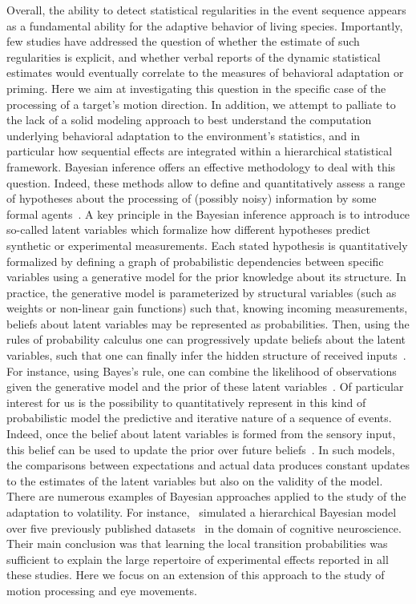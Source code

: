 \documentclass[10pt,letterpaper]{article}
\newcommand{\citep}[1]{\cite{#1}}
\newcommand{\citet}[1]{\cite{#1}}
\begin{document}
Overall, the ability to detect
statistical regularities in the event sequence appears as a fundamental ability
for the adaptive behavior of living species.
Importantly, few studies have addressed the question of whether
the estimate of such regularities is explicit,
and whether verbal reports of the dynamic statistical
estimates would eventually correlate to the measures of behavioral adaptation or priming.
Here we aim at investigating this question
in the specific case of the  processing of a target's motion direction.
In addition, we attempt to palliate to the lack of a solid modeling approach
to best understand the computation underlying behavioral adaptation to the environment's statistics,
and in particular how sequential effects are integrated
within a hierarchical statistical framework.
Bayesian inference offers an effective methodology
to deal with this question.
Indeed, these methods allow to define and quantitatively assess
a range of hypotheses about the processing of (possibly noisy) information by some formal agents~\citep{Deneve1999, Diaconescu2014, Daunizeau10a}.
A key principle in the Bayesian inference approach is
to introduce so-called latent variables
which formalize how different hypotheses predict synthetic or experimental measurements.
Each stated hypothesis is quantitatively formalized
by defining a graph of probabilistic dependencies between specific variables
using a generative model for the prior knowledge about its structure.
In practice, the generative model is parameterized by structural variables
(such as weights or non-linear gain functions)
such that, knowing incoming measurements, beliefs about latent variables
may be represented as probabilities.
Then, using the rules of probability calculus
one can progressively update beliefs about the latent variables,
such that one can finally infer the hidden structure of received inputs~\citep{Hoyer2003, Ma2014}.
For instance, using Bayes's rule, one can combine
the likelihood of observations given the generative model and
the prior of these latent variables~\citep{Jaynes2014}.
Of particular interest for us is the possibility to
quantitatively represent in this kind of probabilistic model
the predictive and iterative nature of a sequence of events.
Indeed, once the belief about latent variables
is formed from the sensory input,
this belief can be used to update
the prior over future beliefs~\citep{Montagnini2007}.
In such models, the comparisons between expectations and actual data produces
constant updates to the estimates of the latent variables
but also on the validity of the model.
There are numerous examples of Bayesian approaches
applied to the study of the adaptation to volatility.
For instance,~\citet{Meyniel16} simulated a hierarchical Bayesian model
over five previously published datasets~\citep{Squires1976, Huettel2002, Kolossa2013, Cho2002, Falk1997}
in the domain of cognitive neuroscience.
Their main conclusion was that
learning the local transition probabilities
was sufficient to explain the large repertoire
of experimental effects reported in all these studies.
Here we focus on an extension of this approach to the study of motion processing and eye movements.
\end{document}
